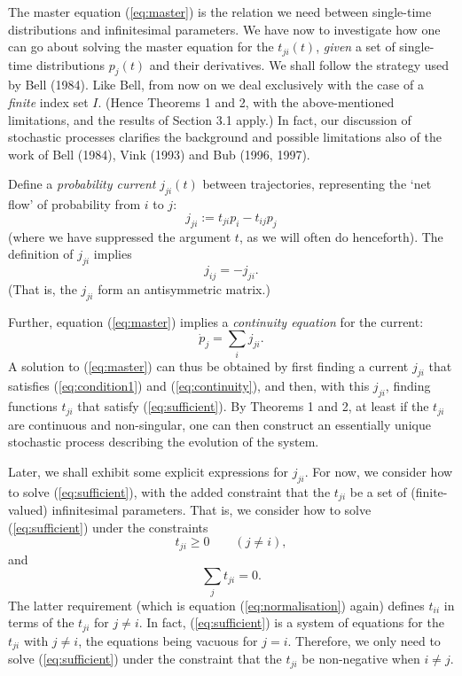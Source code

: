\documentclass[12pt]{article}
\newcommand{\be}{\begin{equation}}
\newcommand{\ee}{\end{equation}}
\begin{document}
The master equation (\ref{eq:master}) is the relation we need between
single-time distributions and infinitesimal parameters.  We have now
to investigate how one can go about solving the master equation for
the $t_{ji}(t)$, {\em given} a set of single-time distributions
$p_j(t)$ and their derivatives.  We shall follow the strategy used by
Bell (1984).  Like Bell, from now on we deal exclusively with the case
of a {\em finite} index set $I$.  (Hence Theorems 1 and 2, with the
above-mentioned limitations, and the results
of Section 3.1 apply.) In fact, our discussion of stochastic processes
clarifies the background and possible limitations also of the work of
Bell (1984), Vink (1993) and Bub (1996, 1997).

Define a {\em probability current} $j_{ji}(t)$ between trajectories,
representing the `net flow' of probability from $i$ to $j$:
  \begin{equation}
    \label{eq:sufficient}
    j_{ji}:= t_{ji}p_i - t_{ij}p_j
  \end{equation}
(where we have suppressed the argument $t$, as we will often do
henceforth).
The definition of $j_{ji}$ implies
  \begin{equation}
    j_{ij} = -j_{ji}.
    \label{eq:condition1}
  \end{equation}
\noindent (That is, the $j_{ji}$ form an antisymmetric matrix.)

Further, equation (\ref{eq:master}) implies a {\em continuity equation}
for the current:
\be
\label{eq:continuity}
\dot{p}_j = \sum_i j_{ji}.
\ee
A solution to (\ref{eq:master}) can thus be obtained by first finding
a current $j_{ji}$ that satisfies (\ref{eq:condition1}) and
(\ref{eq:continuity}), and then, with this $j_{ji}$, finding functions
$t_{ji}$ that satisfy (\ref{eq:sufficient}).  By Theorems 1 and 2, at
least if the $t_{ji}$ are continuous and non-singular,
one can then construct an essentially unique stochastic process
describing the evolution of the system.

Later, we shall exhibit some explicit expressions for $j_{ji}$.  For
now, we consider how to solve (\ref{eq:sufficient}), with the added
constraint that the $t_{ji}$ be a set of (finite-valued) infinitesimal
parameters. That is, we consider how to solve (\ref{eq:sufficient}) under
the constraints
  \begin{equation}
    t_{ji}\geq 0 \qquad(j\neq i),  \label{eq:blah1}
  \end{equation}
and
  \begin{equation}
    \sum_j t_{ji}=0.    \label{eq:blah2}
  \end{equation}
The latter requirement (which is equation (\ref{eq:normalisation})
again) defines $t_{ii}$ in terms of the $t_{ji}$ for $j\neq i$.  In
fact, (\ref{eq:sufficient}) is a system of equations for the $t_{ji}$
with $j\neq i$, the equations being vacuous for $j=i$.  Therefore, we
only need to solve (\ref{eq:sufficient}) under the constraint that the
$t_{ji}$ be non-negative when $i \neq j$.
\end{document}

